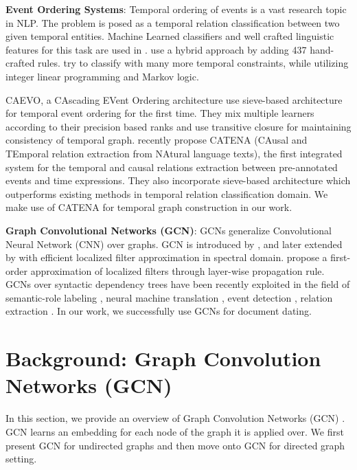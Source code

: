 \documentclass[11pt,a4paper]{article}
\begin{document}
{\bf Event Ordering Systems}: Temporal ordering of events is a vast research topic in NLP. The problem is posed as a temporal relation classification between two given temporal entities. Machine Learned classifiers and well crafted linguistic features for this task are used in \cite{Chambers:2007:CTR:1557769.1557820, E14-1033}. \citet{N13-1112} use a hybrid approach by adding 437 hand-crafted rules. \citet{Chambers:2008:JCI:1613715.1613803, P09-1046} try to classify with many more temporal constraints, while utilizing integer linear programming and Markov logic. 

CAEVO, a CAscading EVent Ordering architecture \cite{Chambers14} use sieve-based architecture 
\cite{sieve_architecture} 
for temporal event ordering for the first time. They mix multiple learners according to their precision based ranks and use transitive closure for maintaining consistency of temporal graph. \citet{catena_paper} recently propose CATENA (CAusal and TEmporal relation extraction from NAtural language texts), the first integrated system for the temporal and causal relations extraction between pre-annotated events and time expressions. They also incorporate sieve-based architecture which outperforms existing methods in temporal relation classification domain. We make use of CATENA for temporal graph construction in our work. 

{\bf Graph Convolutional Networks (GCN)}:
GCNs generalize Convolutional Neural Network (CNN) over graphs. GCN is introduced by \cite{gcn_first_work}, and later extended by \cite{Defferrard:2016:CNN:3157382.3157527} with efficient localized filter approximation in spectral domain. \citet{kipf2016semi} propose a first-order approximation of localized filters through layer-wise propagation rule. GCNs over syntactic dependency trees have been recently exploited in the field of semantic-role labeling \cite{gcn_srl}, neural machine translation \cite{gcn_nmt}, event detection \cite{gcn_event}, relation extraction \cite{reside2018}. In our work, we successfully use GCNs for document dating. 

\section{Background: Graph Convolution Networks (GCN)}
\label{sec:background}



In this section, we provide an overview of Graph Convolution Networks (GCN) \cite{kipf2016semi}. GCN learns an embedding for each node of the graph it is applied over. We first present GCN for undirected graphs and then move onto GCN for directed graph setting. 
\end{document}
